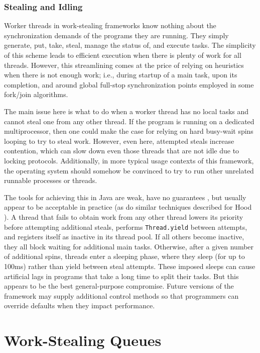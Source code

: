 \subsubsection{Stealing and Idling}

Worker threads in work-stealing frameworks know nothing about the
synchronization demands of the programs they are running. They simply
generate, put, take, steal, manage the status of, and execute
tasks. The simplicity of this scheme leads to efficient execution when
there is plenty of work for all threads. However, this streamlining
comes at the price of relying on heuristics when there is not enough
work; i.e., during startup of a main task, upon its completion, and
around global full-stop synchronization points employed in some
fork/join algorithms.

The main issue here is what to do when a worker thread has no local
tasks and cannot steal one from any other thread. If the program is
running on a dedicated multiprocessor, then one could make the case
for relying on hard busy-wait spins looping to try to steal
work. However, even here, attempted steals increase contention, which
can slow down even those threads that are not idle due to locking
protocols.  Additionally, in more typical usage contexts of this
framework, the operating system should somehow be convinced to try to
run other unrelated runnable processes or threads.

The tools for achieving this in Java are weak, have no guarantees
\cite{Goetz2006}, but usually appear to be acceptable in practice (as
do similar techniques described for Hood \cite{Blumofe1998}). A thread
that fails to obtain work from any other thread lowers its priority
before attempting additional steals, performs \lstinline!Thread.yield!
between attempts, and registers itself as inactive in its thread
pool. If all others become inactive, they all block waiting for
additional main tasks. Otherwise, after a given number of additional
spins, threads enter a sleeping phase, where they sleep (for up to
100ms) rather than yield between steal attempts. These imposed sleeps
can cause artificial lags in programs that take a long time to split
their tasks. But this appears to be the best general-purpose
compromise. Future versions of the framework may supply additional
control methods so that programmers can override defaults when they
impact performance.

\section{Work-Stealing Queues}
\label{sec:queues-background-work-stealing-queues}

